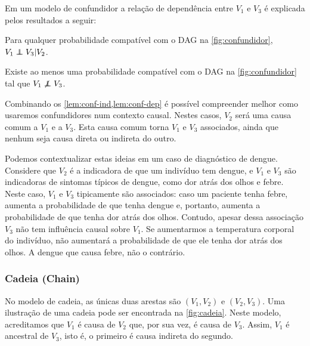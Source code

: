 Em um modelo de confundidor 
a relação de dependência entre 
$V_1$ e $V_3$ é explicada pelos
resultados a seguir:

\begin{lemma}
 \label{lem:conf-ind}
 Para qualquer probabilidade compatível com 
 o DAG na \cref{fig:confundidor},
 $V_1 \perp\!\!\!\!\perp V_3 | V_2$.
\end{lemma}

\begin{lemma}
 \label{lem:conf-dep}
 Existe ao menos uma probabilidade compatível com
 o DAG na \cref{fig:confundidor} tal que
 $V_1 \not\perp\!\!\!\!\perp V_3$.
\end{lemma}

Combinando os \cref{lem:conf-ind,lem:conf-dep} é 
possível compreender melhor como 
usaremos confundidores num contexto causal.
Nestes casos, $V_2$ será uma causa comum a $V_1$ e a $V_3$.
Esta causa comum torna $V_1$ e $V_3$ associados,
ainda que nenhum seja causa direta ou indireta do outro.

Podemos contextualizar estas ideias
em um caso de diagnóstico de dengue.
Considere que 
$V_2$ é a indicadora de que um indivíduo tem dengue, e
$V_1$ e $V_3$ são indicadoras de sintomas típicos de dengue, como
dor atrás dos olhos e febre.
Neste caso, $V_1$ e $V_3$ tipicamente são associados:
caso um paciente tenha febre,
aumenta a probabilidade de que tenha dengue e, portanto,
aumenta a probabilidade de que tenha dor atrás dos olhos.
Contudo, apesar dessa associação 
$V_3$ não tem influência causal sobre $V_1$.
Se aumentarmos a temperatura corporal do indivíduo,
não aumentará a probabilidade de que ele tenha dor atrás dos olhos.
A dengue que causa febre, não o contrário.

\subsubsection{Cadeia (Chain)}

No modelo de cadeia, 
as únicas duas arestas são 
$(V_1, V_2)$ e $(V_2, V_3)$.
Uma ilustração de uma cadeia
pode ser encontrada 
na \cref{fig:cadeia}.
Neste modelo, acreditamos que 
$V_1$ é causa de $V_2$ que,
por sua vez, é causa de $V_3$.
Assim, $V_1$ é ancestral de $V_3$,
isto é, o primeiro é 
causa indireta do segundo.



